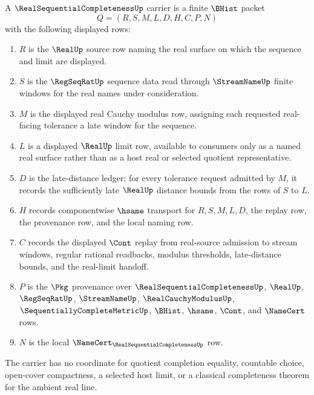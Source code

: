 \begin{definition}
\label{def:real-sequential-completeness-carrier}
A $\RealSequentialCompletenessUp$ carrier is a finite $\BHist$ packet
$$
Q=(R,S,M,L,D,H,C,P,N)
$$
with the following displayed rows:
\begin{enumerate}
\item $R$ is the $\RealUp$ source row naming the real surface on which the sequence and limit are displayed.
\item $S$ is the $\RegSeqRatUp$ sequence data read through $\StreamNameUp$ finite windows for the real names under consideration.
\item $M$ is the displayed real Cauchy modulus row, assigning each requested real-facing tolerance a late window for the sequence.
\item $L$ is a displayed $\RealUp$ limit row, available to consumers only as a named real surface rather than as a host real or selected quotient representative.
\item $D$ is the late-distance ledger; for every tolerance request admitted by $M$, it records the sufficiently late $\RealUp$ distance bounds from the rows of $S$ to $L$.
\item $H$ records componentwise $\hsame$ transport for $R,S,M,L,D$, the replay row, the provenance row, and the local naming row.
\item $C$ records the displayed $\Cont$ replay from real-source admission to stream windows, regular rational readbacks, modulus thresholds, late-distance bounds, and the real-limit handoff.
\item $P$ is the $\Pkg$ provenance over $\RealSequentialCompletenessUp$, $\RealUp$, $\RegSeqRatUp$, $\StreamNameUp$, $\RealCauchyModulusUp$, $\SequentiallyCompleteMetricUp$, $\BHist$, $\hsame$, $\Cont$, and $\NameCert$ rows.
\item $N$ is the local $\NameCert_{\RealSequentialCompletenessUp}$ row.
\end{enumerate}
The carrier has no coordinate for quotient completion equality, countable choice, open-cover compactness, a selected host limit, or a classical completeness theorem for the ambient real line.
\end{definition}

